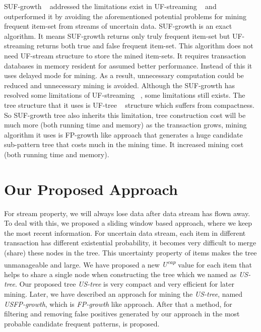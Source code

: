 \documentclass[conference]{IEEEtran}
\begin{document}
SUF-growth ~\cite{DBLP:conf/icde/LeungH09} addressed the limitations exist in UF-streaming ~\cite{DBLP:conf/icde/LeungH09} and outperformed it by avoiding the aforementioned potential problems for mining frequent item-set from streams of uncertain data. SUF-growth is an exact algorithm. It means SUF-growth returns only truly frequent item-set but UF-streaming returns both true and false frequent item-set. This algorithm does not need UF-stream structure to store the mined item-sets. It requires transaction databases in memory resident for assumed better performance. Instead of this it uses delayed mode for mining. As a result, unnecessary computation could be reduced and unnecessary mining is avoided.
%
Although the SUF-growth has resolved some limitations of UF-streaming ~\cite{DBLP:conf/icde/LeungH09}, some limitations still exists. The tree structure that it uses is UF-tree ~\cite{DBLP:conf/kdd/GadeWK04} structure which suffers from compactness. So SUF-growth tree also inherits this limitation, tree construction cost will be much more (both running time and memory) as the transaction grows, mining algorithm it uses is FP-growth like approach that generates a huge candidate sub-pattern tree that costs much in the mining time. It increased mining cost (both running time and memory).
\section{Our Proposed Approach}\label{proposedWork}
For stream property, we will always lose data after data stream has flown away. To deal with this, we proposed a sliding window based approach, where we keep the most recent information. For uncertain data stream, each item in different transaction has different existential probability, it becomes very difficult to merge (share) these nodes in the tree. This uncertainty property of items makes the tree unmanageable and large. We have proposed a new \emph{U\textsuperscript{cap}} value for each item that helps to share a single node when constructing the tree which we named as \emph{US-tree}. Our proposed tree \emph{US-tree} is very compact and very efficient for later mining. Later, we have described an approach for mining the \emph{US-tree}, named \emph{USFP-growth}, which is \emph{FP-growth} like approach. After that a method, for filtering and removing false positives generated by our approach in the most probable candidate frequent patterns, is proposed.
\end{document}

